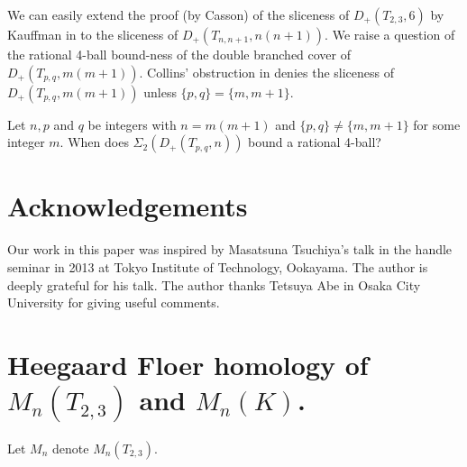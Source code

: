 \documentclass[11pt]{amsart}
\begin{document}
We can easily extend the proof (by Casson) of the sliceness of $D_+(T_{2,3},6)$ by Kauffman in \cite{Kau} 
to the sliceness of $D_+(T_{n,n+1},n(n+1))$.
We raise a question of the rational 4-ball bound-ness of the double branched cover of $D_+(T_{p,q},m(m+1))$.
Collins' obstruction in \cite{JC} denies the sliceness of $D_+(T_{p,q},m(m+1))$ unless $\{p,q\}=\{m,m+1\}$.
\begin{que}
Let $n, p$ and $q$ be integers with $n=m(m+1)$ and $\{p,q\}\neq \{m,m+1\}$ for some integer $m$.
When does $\Sigma_2(D_+(T_{p,q},n))$ bound a rational 4-ball?
\end{que}

\section*{Acknowledgements}
Our work in this paper was inspired by Masatsuna Tsuchiya's talk in the handle seminar in 2013 at Tokyo Institute of Technology, Ookayama.
The author is deeply grateful for his talk.
The author thanks Tetsuya Abe in Osaka City University for giving useful comments.

\section{Heegaard Floer homology of $M_n(T_{2,3})$ and $M_n(K)$.}
Let $M_n$ denote $M_n(T_{2,3})$.
\end{document}
